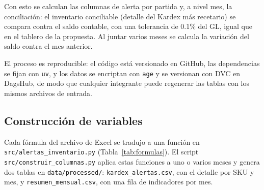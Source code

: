 \documentclass[11pt,letterpaper]{article}
\begin{document}
Con esto se calculan las columnas de alerta por partida y, a nivel mes, la conciliación: el inventario conciliable (detalle del Kardex más recetario) se compara contra el saldo contable, con una tolerancia de 0.1\% del GL, igual que en el tablero de la propuesta. Al juntar varios meses se calcula la variación del saldo contra el mes anterior.

El proceso es reproducible: el código está versionado en GitHub, las dependencias se fijan con \texttt{uv}, y los datos se encriptan con \texttt{age} y se versionan con DVC en DagsHub, de modo que cualquier integrante puede regenerar las tablas con los mismos archivos de entrada.

\subsection{Construcción de variables}
\label{sec:variables}

Cada fórmula del archivo de Excel se tradujo a una función en \texttt{src/alertas\_inventario.py} (Tabla~\ref{tab:formulas}). El script \texttt{src/construir\_columnas.py} aplica estas funciones a uno o varios meses y genera dos tablas en \texttt{data/processed/}: \texttt{kardex\_alertas.csv}, con el detalle por SKU y mes, y \texttt{resumen\_mensual.csv}, con una fila de indicadores por mes.
\end{document}
